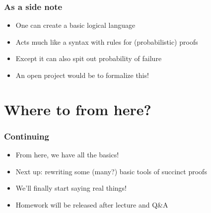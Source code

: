 \documentclass{beamer}
\begin{document}
    \begin{frame}
        \frametitle{As a side note}
        \begin{itemize}\itemsep=12pt
            \item One can create a basic logical language
            \item Acts much like a syntax with rules for (probabilistic) proofs
            \item Except it can also spit out probability of failure
            \item An open project would be to formalize this!
        \end{itemize}
    \end{frame}

    \section{Where to from here?}

    \begin{frame}
        \frametitle{Continuing}
        \begin{itemize}\itemsep=12pt
            \item From here, we have all the basics!
            \pause
            \item Next up: rewriting some (many?) basic tools of succinct proofs
            \pause
            \item We'll finally start saying real things!
            \pause
            \item Homework will be released after lecture and Q\&A
        \end{itemize}
    \end{frame}
\end{document}
